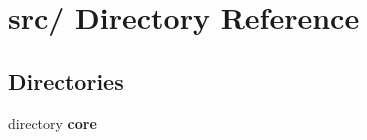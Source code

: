 \section{src/ Directory Reference}
\label{dir_29dfbfd23c996ac0b854f66db54924e6}


\subsection*{Directories}
\begin{CompactItemize}
\item 
directory {\bf core}
\end{CompactItemize}
